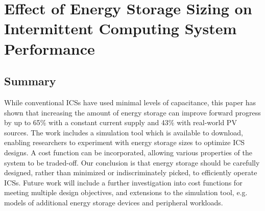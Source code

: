\chapter{Effect of Energy Storage Sizing on Intermittent Computing System Performance}
\label{Chapter:sizingeffect}


% 




\section{Summary}

While conventional ICSs have used minimal levels of capacitance, this paper has shown that increasing the amount of energy storage can improve forward progress by up to 65\% with a constant current supply and 43\% with real-world PV sources. The work includes a simulation tool which is available to download, enabling researchers to experiment with energy storage sizes to optimize ICS designs. A cost function can be incorporated, allowing various properties of the system to be traded-off. Our conclusion is that energy storage should be carefully designed, rather than minimized or indiscriminately picked, to efficiently operate ICSs. Future work will include a further investigation into cost functions for meeting multiple design objectives, and extensions to the simulation tool, e.g. models of additional energy storage devices and peripheral workloads.